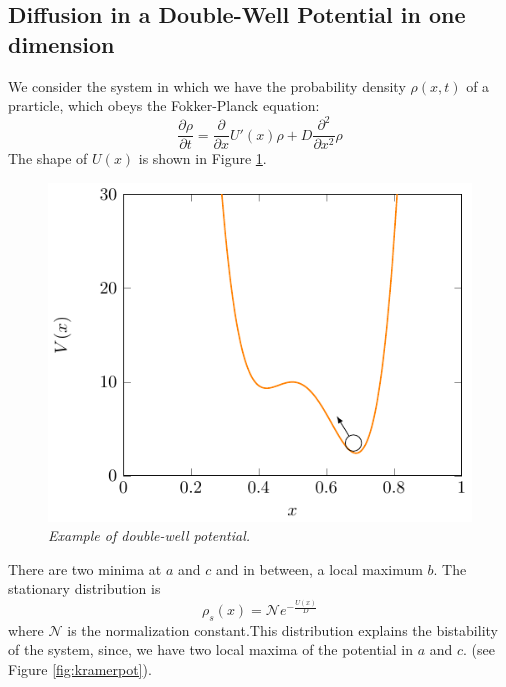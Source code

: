 \subsection{Diffusion in a Double-Well Potential in one dimension}
We consider the system in which we have the probability density $\rho(x,t)$ of a prarticle, which obeys the Fokker-Planck equation:
\begin{equation}
\frac{\partial \rho}{\partial t } = \frac{\partial}{\partial x} U'(x)\rho + D \frac{\partial ^2 }{\partial x^2} \rho
\end{equation}
The shape of $U(x)$ is shown in Figure \ref{fig:kr}.
\begin{figure}[h]
\centering
\includegraphics[scale=1.2]{images/kramerwell.pdf}
\caption{\emph{Example of double-well potential.}}
\label{fig:kr}
\end{figure}

There are two minima at $a$ and $c$ and in between, a local maximum $b$. The stationary distribution is
\begin{equation}
\rho_s(x) = \mathcal{N} e^{-\frac{U(x)}{D}}
\end{equation}
where $\mathcal{N}$ is the normalization constant.This distribution explains the bistability of the system, since, we have two local maxima of the potential in $a$ and $c$. (see Figure \ref{fig:kramerpot}).

